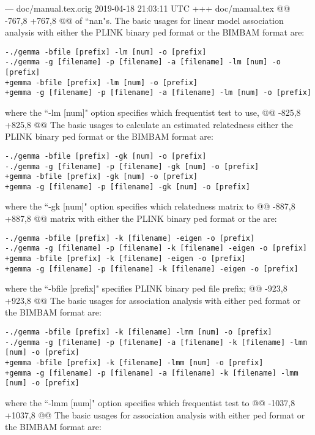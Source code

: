 --- doc/manual.tex.orig	2019-04-18 21:03:11 UTC
+++ doc/manual.tex
@@ -767,8 +767,8 @@ of ``nan"s.
 The basic usages for linear model association analysis with either the PLINK binary ped format or the BIMBAM format are:
 
 \begin{verbatim}
-./gemma -bfile [prefix] -lm [num] -o [prefix]
-./gemma -g [filename] -p [filename] -a [filename] -lm [num] -o [prefix]
+gemma -bfile [prefix] -lm [num] -o [prefix]
+gemma -g [filename] -p [filename] -a [filename] -lm [num] -o [prefix]
 \end{verbatim}
 
 where the ``-lm [num]" option specifies which frequentist test to use,
@@ -825,8 +825,8 @@ The basic usages to calculate an estimated relatedness
 either the PLINK binary ped format or the BIMBAM format are:
 \begin{verbatim}
-./gemma -bfile [prefix] -gk [num] -o [prefix]
-./gemma -g [filename] -p [filename] -gk [num] -o [prefix]
+gemma -bfile [prefix] -gk [num] -o [prefix]
+gemma -g [filename] -p [filename] -gk [num] -o [prefix]
 \end{verbatim}
 where the ``-gk [num]" option specifies which relatedness matrix to
@@ -887,8 +887,8 @@ matrix with either the PLINK binary ped format or the 
 are:
 \begin{verbatim}
-./gemma -bfile [prefix] -k [filename] -eigen -o [prefix]
-./gemma -g [filename] -p [filename] -k [filename] -eigen -o [prefix]
+gemma -bfile [prefix] -k [filename] -eigen -o [prefix]
+gemma -g [filename] -p [filename] -k [filename] -eigen -o [prefix]
 \end{verbatim}
 where the ``-bfile [prefix]" specifies PLINK binary ped file prefix;
@@ -923,8 +923,8 @@ The basic usages for association analysis with either 
 ped format or the BIMBAM format are:
 
 \begin{verbatim}
-./gemma -bfile [prefix] -k [filename] -lmm [num] -o [prefix]
-./gemma -g [filename] -p [filename] -a [filename] -k [filename] -lmm [num] -o [prefix]
+gemma -bfile [prefix] -k [filename] -lmm [num] -o [prefix]
+gemma -g [filename] -p [filename] -a [filename] -k [filename] -lmm [num] -o [prefix]
 \end{verbatim}
 
 where the ``-lmm [num]" option specifies which frequentist test to
@@ -1037,8 +1037,8 @@ The basic usages for association analysis with either 
 ped format or the BIMBAM format are:
 
